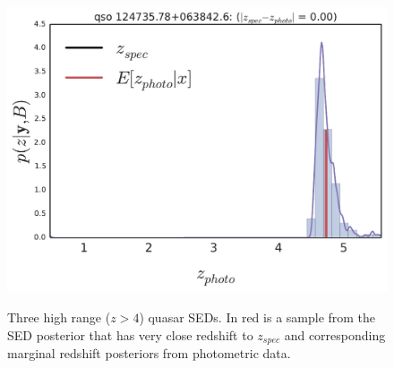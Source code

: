 \documentclass{article}
\begin{document}
\begin{figure}[t]
{\includegraphics[width=.56\columnwidth]{../../figs/quasar_plots/close_hi/quasar_1854_posterior_z}
}
\vskip -0.2in
\caption{ Three high range ($z > 4$) quasar SEDs.  In red is a sample from the SED posterior that has very close redshift to $z_{spec}$ and corresponding marginal redshift posteriors from photometric data. }
\label{fig:recon}
\vskip -0.2in
\end{figure}
\clearpage
\end{document}

